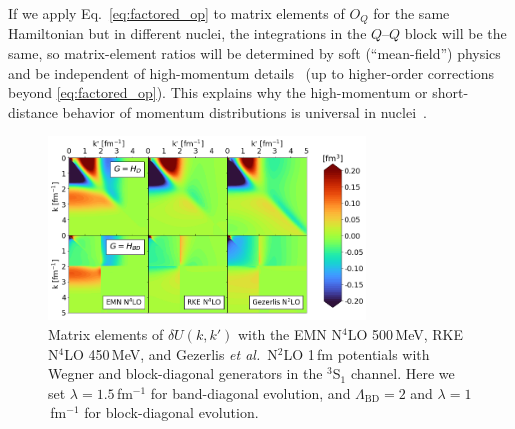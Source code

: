 \documentclass[10pt,aps,prc,floatfix,twocolumn,nofootinbib]{revtex4-1}
\newcommand{\LambdaBD}{{\Lambda_{\text{BD}}}}
\newcommand{\QQ}{\ensuremath{Q\mbox{--}Q}}
\begin{document}
If we apply Eq.~\eqref{eq:factored_op} to matrix elements of $O_Q$ for the same Hamiltonian but in different nuclei, the integrations in the $\QQ$ block will be the same, so matrix-element ratios will be determined by soft (``mean-field'') physics and be independent of high-momentum details~\cite{Anderson:2010aq} (up to higher-order corrections beyond \eqref{eq:factored_op}). 
This explains why the high-momentum or short-distance behavior of momentum distributions is universal in nuclei~\cite{Anderson:2010aq,Bogner:2012zm,Neff:2015xda,Cruz-Torres:2019fum}.


%
\begin{figure}[tbh]
	\includegraphics[clip,width=0.75\textwidth]{unitary_transformation_contours_kvnns_79_111_222_lamb1p5_Lamb2p0.png}%
	\caption{Matrix elements of $\delta U(k,k')$ with the EMN N$^4$LO 500\,MeV, RKE N$^4$LO 450\,MeV, and Gezerlis \textit{et al.}~N$^2$LO 1\,fm potentials with Wegner and block-diagonal generators in the $^3$S$_1$ channel. Here we set $\lambda=1.5$\,fm$^{-1}$ for band-diagonal evolution, and $\LambdaBD=2$ and $\lambda=1$\,fm$^{-1}$ for block-diagonal evolution.}
	\label{fig:delta_U_default_potentials}
\end{figure}
\end{document}
